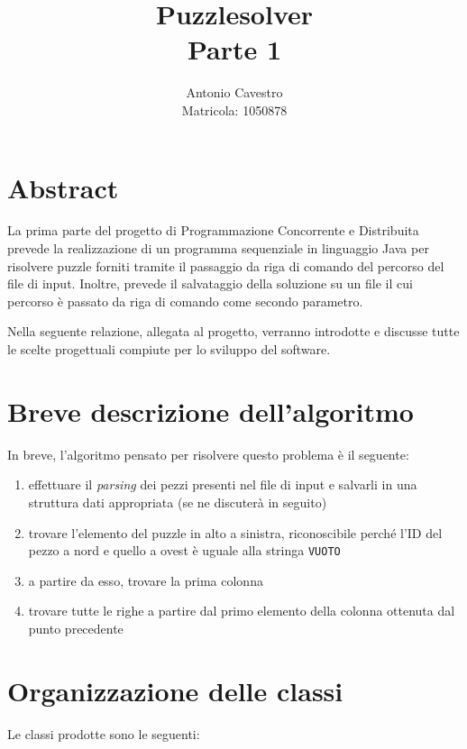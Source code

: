\documentclass[a4paper, 12pt]{article}
\title{Puzzlesolver \\ \vspace{2 mm} {\small Parte 1}}
\author{Antonio Cavestro \\ \vspace{2 mm} {\small Matricola: 1050878}}
\date{}
\begin{document}
	
  \maketitle

  \section{Abstract}

    La prima parte del progetto di Programmazione Concorrente e Distribuita prevede la realizzazione di un programma sequenziale in linguaggio Java per risolvere puzzle forniti tramite il passaggio da riga di comando del percorso del file di input. Inoltre, prevede il salvataggio della soluzione su un file il cui percorso è passato da riga di comando come secondo parametro.

    Nella seguente relazione, allegata al progetto, verranno introdotte e discusse tutte le scelte progettuali compiute per lo sviluppo del software.

  \section{Breve descrizione dell'algoritmo}

    In breve, l'algoritmo pensato per risolvere questo problema è il seguente:

    \begin{enumerate}

      \item effettuare il \emph{parsing} dei pezzi presenti nel file di input e salvarli in una struttura dati appropriata (se ne discuterà in seguito)
      \item trovare l'elemento del puzzle in alto a sinistra, riconoscibile perché l'ID del pezzo a nord e quello a ovest è uguale alla stringa \verb|VUOTO|
      \item a partire da esso, trovare la prima colonna
      \item trovare tutte le righe a partire dal primo elemento della colonna ottenuta dal punto precedente

    \end{enumerate}

	\section{Organizzazione delle classi}

    Le classi prodotte sono le seguenti:
\end{document}
